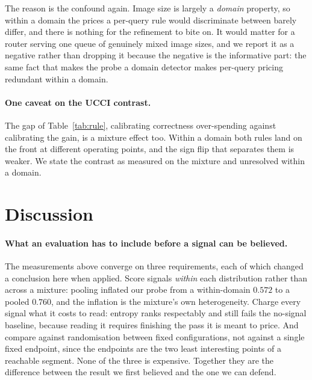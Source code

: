 \documentclass[10pt,twocolumn]{article}
\theoremstyle{plain}
\begin{document}
The reason is the confound again. Image size is largely a \emph{domain}
property, so within a domain the prices a per-query rule would discriminate
between barely differ, and there is nothing for the refinement to bite on. It
would matter for a router serving one queue of genuinely mixed image sizes, and
we report it as a negative rather than dropping it because the negative is the
informative part: the same fact that makes the probe a domain detector makes
per-query pricing redundant within a domain.

\paragraph{One caveat on the UCCI contrast.} The gap of
Table~\ref{tab:rule}, calibrating correctness over-spending against calibrating the gain, is a mixture effect too. Within a domain both rules land on the front
at different operating points, and the sign flip that separates them is weaker.
We state the contrast as measured on the mixture and unresolved within a domain.

\section{Discussion}
\label{sec:discussion}

\paragraph{What an evaluation has to include before a signal can be believed.}
The measurements above converge on three requirements, each of which changed a
conclusion here when applied. Score signals \emph{within} each distribution
rather than across a mixture: pooling inflated our probe from a within-domain
$0.572$ to a pooled $0.760$, and the inflation is the mixture's own
heterogeneity. Charge every signal what it costs to read: entropy ranks
respectably and still fails the no-signal baseline, because reading it requires
finishing the pass it is meant to price. And compare against randomisation
between fixed configurations, not against a single fixed endpoint, since the
endpoints are the two least interesting points of a reachable segment. None of
the three is expensive. Together they are the difference between the result we
first believed and the one we can defend.
\end{document}
